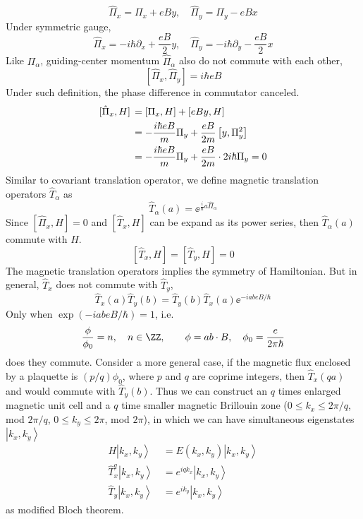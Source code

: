 \documentclass[12pt,a4paper]{article}
\newcommand{\ket}[1]{\left|{#1}\right\rangle}
\begin{document}
    \begin{equation}
        \hat{\Pi}_x = \Pi_x + eBy, \quad
        \hat{\Pi}_y = \Pi_y - eBx
    \end{equation}
    Under symmetric gauge,
    \[
        \hat{\Pi}_x = -i\hbar\partial_x + \frac{eB}{2}y, \quad
        \hat{\Pi}_y = -i\hbar\partial_y - \frac{eB}{2}x
    \]
    Like $\Pi_{\alpha}$, guiding-center momentum $\hat{\Pi}_{\alpha}$ also do not commute with each other,
    \[
        [\hat{\Pi}_x, \hat{\Pi}_y] = i\hbar eB
    \]
    Under such definition, the phase difference in commutator canceled.
    \[\begin{aligned}\relax
        [\hat{\Pi}_x, H]
        &\, = \left[\Pi_x, H\right] + \left[eBy, H\right] \\
        &\, = -\frac{i\hbar eB}{m} \Pi_y + \frac{eB}{2m} \left[y,\Pi_y^2\right] \\
        &\, = -\frac{i\hbar eB}{m} \Pi_y + \frac{eB}{2m} \cdot 2i\hbar\Pi_y
        = 0
    \end{aligned}\]
    Similar to covariant translation operator, we define magnetic translation operators $\hat{T}_{\alpha}$ as
    \begin{equation}
        \hat{T}_{\alpha}(a)
        = \ee^{\frac{i}{\hbar}a \hat{\Pi}_{\alpha}}
    \end{equation}
    Since $[\hat{\Pi}_x, H]=0$ and $[\hat{T}_x, H]$ can be expand as its power series, then $\hat{T}_{\alpha}(a)$ commute with $H$.
    \begin{equation}
        [\hat{T}_x, H] = [\hat{T}_y, H] = 0
    \end{equation}
    The magnetic translation operators implies the symmetry of Hamiltonian. But in general, $\hat{T}_x$ does not commute with $\hat{T}_y$,
    \begin{equation}
        \hat{T}_x(a) \hat{T}_y(b) = \hat{T}_y(b) \hat{T}_x(a) \ee^{-iabeB/\hbar}
    \end{equation}
    Only when $\exp(-iabeB/\hbar) =1$, i.e.
    \begin{equation}
        \frac{\phi}{\phi_0} = n, \quad n \in \ZZ, \qquad
        \phi = ab\cdot B, \quad
        \phi_0 = \frac{e}{2\pi\hbar}
    \end{equation}
    does they commute. Consider a more general case, if the magnetic flux enclosed by a plaquette is $(p / q) \phi_0$, where $p$ and $q$ are coprime integers, then $\hat{T}_x(qa)$ and would commute with $\hat{T}_y(b)$. Thus we can construct an $q$ times enlarged magnetic unit cell and a $q$ time smaller magnetic Brillouin zone ($0 \leq k_x \leq 2\pi/q$, mod $2\pi/q$, $0 \leq k_y \leq 2\pi$, mod $2\pi$), in which we can have simultaneous eigenstates $\ket{k_x, k_y}$
    \[\begin{aligned}
        H\ket{k_x, k_y}
        &\, = E(k_x, k_y)\ket{k_x, k_y} \\
        \hat{T}_x^q\ket{k_x, k_y}
        &\, = e^{iqk_x}\ket{k_x, k_y} \\
        \hat{T}_y\ket{k_x, k_y}
        &\, = e^{ik_y}\ket{k_x, k_y}
    \end{aligned}\]
    as modified Bloch theorem.
\end{document}
